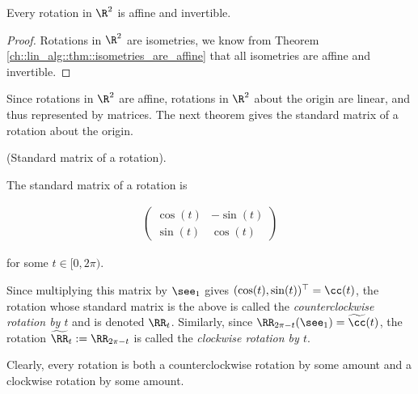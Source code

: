\begin{theorem}
	Every rotation in $\R^2$ is affine and invertible.
\end{theorem}

\begin{proof}
	Rotations in $\R^2$ are isometries, we know from Theorem \ref{ch::lin_alg::thm::isometries_are_affine} that all isometries are affine and invertible.
\end{proof}

Since rotations in $\R^2$ are affine, rotations in $\R^2$ about the origin are linear, and thus represented by matrices. The next theorem gives the standard matrix of a rotation about the origin.

\begin{theorem}
	\label{ch::lin_alg::defn::standard_matrix_rotation}
	(Standard matrix of a rotation).
	
	The standard matrix of a rotation is
	
	\begin{align*}
		\begin{pmatrix}
			\cos(t) & -\sin(t) \\
			\sin(t) & \cos(t)
		\end{pmatrix}
	\end{align*}
	
	for some $t \in [0, 2\pi)$.
	
	Since multiplying this matrix by $\see_1$ gives $(\cos(t), \sin(t))^\top = \cc(t)$, the rotation whose standard matrix is the above is called the \textit{counterclockwise rotation by $t$} and is denoted $\RR_t$. Similarly, since $\RR_{2\pi - t}(\see_1) = \widetilde{\cc}(t)$, the rotation $\widetilde{\RR}_t := \RR_{2\pi - t}$ is called the \textit{clockwise rotation by $t$}.
	
	Clearly, every rotation is both a counterclockwise rotation by some amount and a clockwise rotation by some amount.
\end{theorem}

